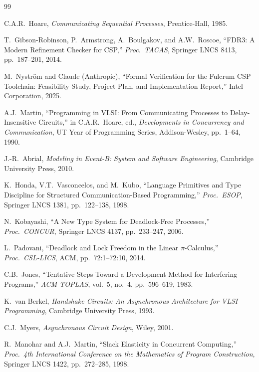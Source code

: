 \documentclass[11pt]{article}
\begin{document}
\begin{thebibliography}{99}

C.A.R.\ Hoare,
\textit{Communicating Sequential Processes},
Prentice-Hall, 1985.

T.\ Gibson-Robinson, P.\ Armstrong, A.\ Boulgakov, and A.W.\ Roscoe,
``FDR3: A Modern Refinement Checker for CSP,''
\textit{Proc.\ TACAS}, Springer LNCS 8413, pp.\ 187--201, 2014.

M.\ Nystr\"om and Claude (Anthropic),
``Formal Verification for the Fulcrum CSP Toolchain: Feasibility
Study, Project Plan, and Implementation Report,''
Intel Corporation, 2025.

A.J.\ Martin,
``Programming in VLSI: From Communicating Processes to
Delay-Insensitive Circuits,''
in C.A.R.\ Hoare, ed., \textit{Developments in Concurrency and
Communication}, UT Year of Programming Series, Addison-Wesley,
pp.\ 1--64, 1990.

J.-R.\ Abrial,
\textit{Modeling in Event-B: System and Software Engineering},
Cambridge University Press, 2010.

K.\ Honda, V.T.\ Vasconcelos, and M.\ Kubo,
``Language Primitives and Type Discipline for Structured
Communication-Based Programming,''
\textit{Proc.\ ESOP}, Springer LNCS 1381, pp.\ 122--138, 1998.

N.\ Kobayashi,
``A New Type System for Deadlock-Free Processes,''
\textit{Proc.\ CONCUR}, Springer LNCS 4137, pp.\ 233--247, 2006.

L.\ Padovani,
``Deadlock and Lock Freedom in the Linear $\pi$-Calculus,''
\textit{Proc.\ CSL-LICS}, ACM, pp.\ 72:1--72:10, 2014.

C.B.\ Jones,
``Tentative Steps Toward a Development Method for Interfering
Programs,''
\textit{ACM TOPLAS}, vol.\ 5, no.\ 4, pp.\ 596--619, 1983.

K.\ van Berkel,
\textit{Handshake Circuits: An Asynchronous Architecture for VLSI
Programming},
Cambridge University Press, 1993.

C.J.\ Myers,
\textit{Asynchronous Circuit Design},
Wiley, 2001.

R.\ Manohar and A.J.\ Martin,
``Slack Elasticity in Concurrent Computing,''
\textit{Proc.\ 4th International Conference on the Mathematics of
Program Construction}, Springer LNCS 1422, pp.\ 272--285, 1998.


\end{thebibliography}
\end{document}
